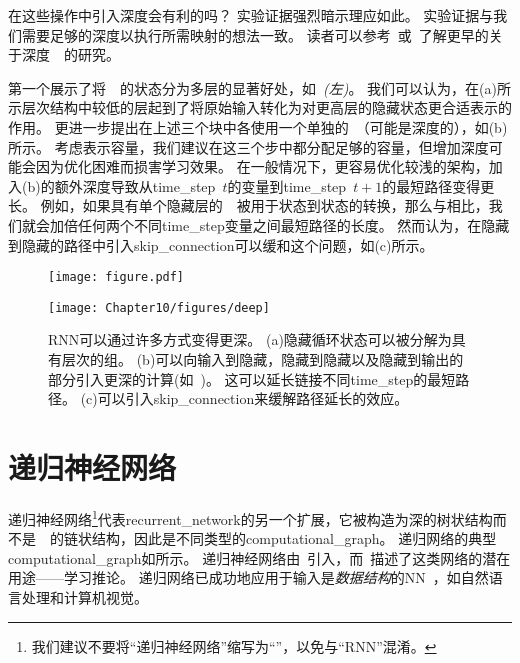 在这些操作中引入深度会有利的吗？
实验证据\citep{Graves-et-al-ICASSP2013,Pascanu-et-al-ICLR2014}强烈暗示理应如此。
实验证据与我们需要足够的深度以执行所需映射的想法一致。
读者可以参考~\cite{Schmidhuber92,ElHihi+Bengio-nips8}或~\cite{Jaeger2007}了解更早的关于深度~~的研究。

\cite{Graves-et-al-ICASSP2013}第一个展示了将~~的状态分为多层的显著好处，如~\emph{(左)}。
我们可以认为，在(a)所示层次结构中较低的层起到了将原始输入转化为对更高层的隐藏状态更合适表示的作用。
\cite{Pascanu-et-al-ICLR2014}更进一步提出在上述三个块中各使用一个单独的~（可能是深度的），如(b)所示。
考虑表示容量，我们建议在这三个步中都分配足够的容量，但增加深度可能会因为优化困难而损害学习效果。
在一般情况下，更容易优化较浅的架构，加入(b)的额外深度导致从\gls{time_step}~$t$的变量到\gls{time_step}~$t+1$的最短路径变得更长。
例如，如果具有单个隐藏层的~~被用于状态到状态的转换，那么与相比，我们就会加倍任何两个不同\gls{time_step}变量之间最短路径的长度。
然而\cite{Pascanu-et-al-ICLR2014}认为，在隐藏到隐藏的路径中引入\gls{skip_connection}可以缓和这个问题，如(c)所示。


\begin{figure}[!htb]
\ifOpenSource
\centerline{\texttt{[image: figure.pdf]}}
\else
\centerline{\texttt{[image: Chapter10/figures/deep]}}
\fi
\caption{\gls{RNN}可以通过许多方式变得更深\citep{Pascanu-et-al-ICLR2014}。
(a)隐藏循环状态可以被分解为具有层次的组。
(b)可以向输入到隐藏，隐藏到隐藏以及隐藏到输出的部分引入更深的计算(如~)。
这可以延长链接不同\gls{time_step}的最短路径。
(c)可以引入\gls{skip_connection}来缓解路径延长的效应。
}
\label{fig:chap10_deep}
\end{figure}

\section{递归神经网络}
\label{sec:recursive_neural_networks}
递归神经网络\footnote{我们建议不要将``递归神经网络''缩写为``''，以免与``\gls{RNN}''混淆。}代表\gls{recurrent_network}的另一个扩展，它被构造为深的树状结构而不是~~的链状结构，因此是不同类型的\gls{computational_graph}。
递归网络的典型\gls{computational_graph}如所示。
递归神经网络由~\cite{Pollack90}引入，而~\cite{tr-bottou-2011}描述了这类网络的潜在用途——学习推论。
递归网络已成功地应用于输入是\emph{数据结构}的\gls{NN}~\citep{Frasconi97,Frasconi-1998}，如自然语言处理\citep{Socher+al-NIPS2011,Socher+al-EMNLP2011-small,Socher-et-al-EMNLP2013}和计算机视觉\citep{Socher-2011}。

